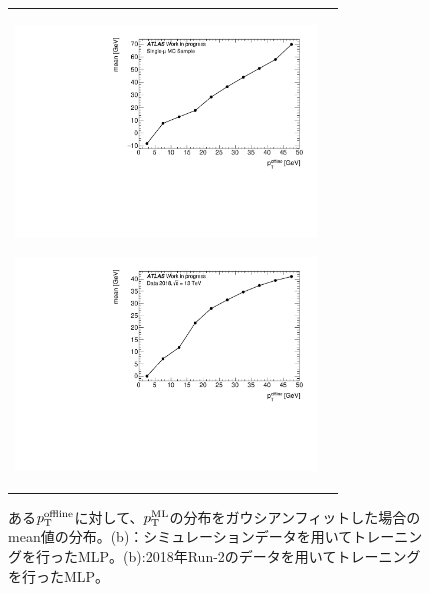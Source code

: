 \begin{figure}
    \begin{tabular}{cc}
    \centering
    \begin{minipage}[b]{0.45\hsize}%
        \centering
        \hspace*{-1.5cm}
        \includegraphics[clip, width=8cm]{fig/4/predtrue_MC_v1.pdf}
        \subcaption{}
        \label{}
    \end{minipage}%
    \begin{minipage}[b]{0.65\hsize}%
        \centering
        \hspace*{-1cm}
        \includegraphics[clip, width=8cm]{fig/4/predtrue_v1.pdf}
        \subcaption{}
        \label{MC_input}
    \end{minipage}%
    \end{tabular}
    \caption{ある$p_{\rm{T}}^{\rm{offline}}$に対して、$p_{\rm{T}}^{\rm{ML}}$の分布をガウシアンフィットした場合のmean値の分布。(b)：シミュレーションデータを用いてトレーニングを行ったMLP。(b):2018年Run-2のデータを用いてトレーニングを行ったMLP。}
    \label{fig:Gausmu}
\end{figure}


